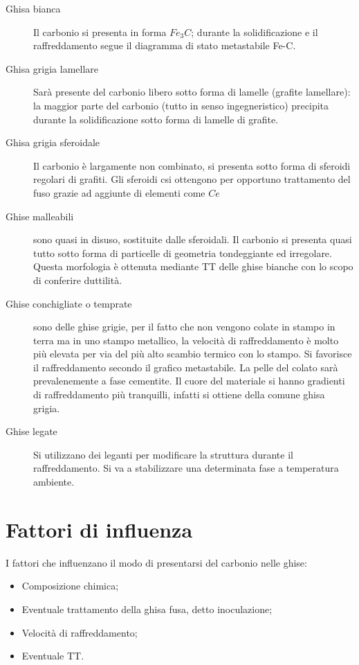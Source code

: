 \begin{description}
\item[Ghisa bianca] Il carbonio si presenta in forma $Fe_3C$; durante la solidificazione e il raffreddamento segue il diagramma di stato metastabile Fe-C.
\item[Ghisa grigia lamellare] Sarà presente del carbonio libero sotto forma di lamelle (grafite lamellare): la maggior parte del carbonio (tutto in senso ingegneristico) precipita durante la solidificazione sotto forma di lamelle di grafite.
\item[Ghisa grigia sferoidale] Il carbonio è largamente non combinato, si presenta sotto forma di sferoidi regolari di grafiti. Gli sferoidi csi ottengono per opportuno trattamento del fuso grazie ad aggiunte di elementi come $Ce$\todo{\\Completare}
\item[Ghise malleabili] sono quasi in disuso, sostituite dalle sferoidali. Il carbonio si presenta quasi tutto sotto forma di particelle di geometria tondeggiante ed irregolare. Questa morfologia è ottenuta mediante \ac{TT} delle ghise bianche con lo scopo di conferire duttilità.
\item[Ghise conchigliate o temprate] sono delle ghise grigie, per il fatto che non vengono colate in stampo in terra ma in uno stampo metallico, la velocità di raffreddamento è molto più elevata per via del più alto scambio termico con lo stampo. Si favorisce il raffreddamento secondo il grafico metastabile. La pelle del colato sarà prevalenemente a fase cementite. Il cuore del materiale si hanno gradienti di raffreddamento più tranquilli, infatti si ottiene della comune ghisa grigia.
\item[Ghise legate] Si utilizzano dei leganti per modificare la struttura durante il raffreddamento. Si va a stabilizzare una determinata fase a temperatura ambiente.
\end{description}


\section{Fattori di influenza}
I fattori che influenzano il modo di presentarsi del carbonio nelle ghise:
\begin{itemize}
\item Composizione chimica;
\item Eventuale trattamento della ghisa fusa, detto inoculazione;
\item Velocità di raffreddamento;
\item Eventuale \ac{TT}.
\end{itemize}

